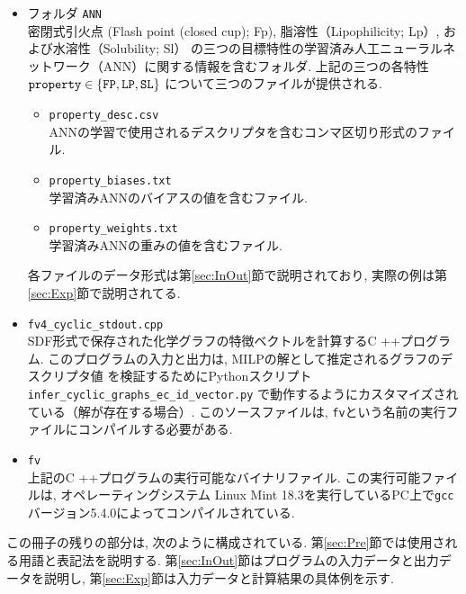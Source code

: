 \documentclass[11pt, titlepage, dvipdfmx, twoside]{jarticle}
\newcommand{\target}{目標}
\begin{document}
\begin{itemize}
\begin{itemize}
\item フォルダ {\tt ANN}\\
  密閉式引火点 (Flash point (closed cup); Fp), 
  脂溶性（Lipophilicity; Lp）, 
  および水溶性（Solubility; Sl）
  の三つの\target 特性の学習済み人工ニューラルネットワーク（ANN）に関する情報を含むフォルダ. 
  上記の三つの各特性${\tt property}\in \{{\tt FP, LP, SL}\}$ について三つのファイルが提供される. 
%
\begin{itemize}
\item {\tt property\_desc.csv}\\
ANNの学習で使用されるデスクリプタを含むコンマ区切り形式のファイル. 

\item {\tt property\_biases.txt}\\
学習済みANNのバイアスの値を含むファイル. 

\item {\tt property\_weights.txt}\\
学習済みANNの重みの値を含むファイル. 
\end{itemize}
%
各ファイルのデータ形式は第\ref{sec:InOut}節で説明されており, 実際の例は第\ref{sec:Exp}節で説明されてる. 

\item {\tt fv4\_cyclic\_stdout.cpp}\\
SDF形式で保存された化学グラフの特徴ベクトルを計算するC ++プログラム. 
このプログラムの入力と出力は, MILPの解として推定されるグラフのデスクリプタ値
を検証するためにPythonスクリプト{\tt infer\_cyclic\_graphs\_ec\_id\_vector.py}
で動作するようにカスタマイズされている（解が存在する場合）. 
このソースファイルは, {\tt fv}という名前の実行ファイルにコンパイルする必要がある. 

\item {\tt fv}\\
上記のC ++プログラムの実行可能なバイナリファイル. 
この実行可能ファイルは, オペレーティングシステム
Linux Mint 18.3を実行しているPC上で{\tt gcc}バージョン5.4.0によってコンパイルされている. 
%
\end{itemize}
\end{itemize}



この冊子の残りの部分は, 次のように構成されている. 
第\ref{sec:Pre}節では使用される用語と表記法を説明する. 
%
第\ref{sec:InOut}節はプログラムの入力データと出力データを説明し, 
第\ref{sec:Exp}節は入力データと計算結果の具体例を示す. 
\end{document}
